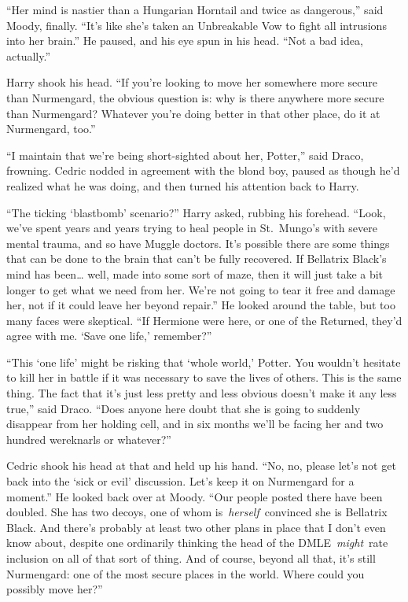 ``Her mind is nastier than a Hungarian Horntail and twice as
dangerous,'' said Moody, finally. ``It's like she's taken an Unbreakable
Vow to fight all intrusions into her brain.'' He paused, and his eye
spun in his head. ``Not a bad idea, actually.''

Harry shook his head. ``If you're looking to move her somewhere more
secure than Nurmengard, the obvious question is: why is there anywhere
more secure than Nurmengard? Whatever you're doing better in that other
place, do it at Nurmengard, too.''

``I maintain that we're being short-sighted about her, Potter,'' said
Draco, frowning. Cedric nodded in agreement with the blond boy, paused
as though he'd realized what he was doing, and then turned his attention
back to Harry.

``The ticking `blastbomb' scenario?'' Harry asked, rubbing his forehead.
``Look, we've spent years and years trying to heal people in St.~Mungo's
with severe mental trauma, and so have Muggle doctors. It's possible
there are some things that can be done to the brain that can't be fully
recovered. If Bellatrix Black's mind has been\ldots{} well, made into
some sort of maze, then it will just take a bit longer to get what we
need from her. We're not going to tear it free and damage her, not if it
could leave her beyond repair.'' He looked around the table, but too
many faces were skeptical. ``If Hermione were here, or one of the
Returned, they'd agree with me. `Save one life,' remember?''

``This `one life' might be risking that `whole world,' Potter. You
wouldn't hesitate to kill her in battle if it was necessary to save the
lives of others. This is the same thing. The fact that it's just less
pretty and less obvious doesn't make it any less true,'' said Draco.
``Does anyone here doubt that she is going to suddenly disappear from
her holding cell, and in six months we'll be facing her and two hundred
wereknarls or whatever?''

Cedric shook his head at that and held up his hand. ``No, no, please
let's not get back into the `sick or evil' discussion. Let's keep it on
Nurmengard for a moment.'' He looked back over at Moody. ``Our people
posted there have been doubled. She has two decoys, one of whom
is~\emph{herself}~convinced she is Bellatrix Black. And there's probably
at least two other plans in place that I don't even know about, despite
one ordinarily thinking the head of the DMLE~\emph{might}~rate inclusion
on all of that sort of thing. And of course, beyond all that, it's still
Nurmengard: one of the most secure places in the world. Where could you
possibly move her?''

